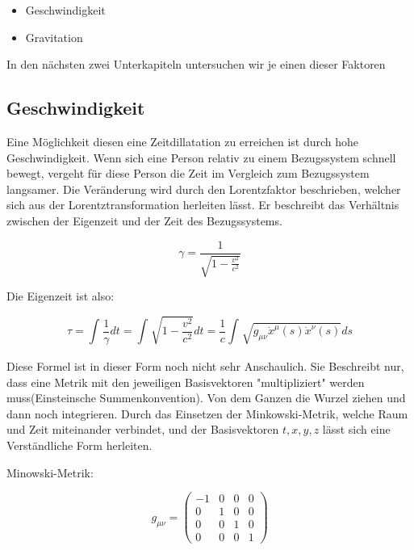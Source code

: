 \begin{refsection}
\begin{itemize}
    \item Geschwindigkeit
    \item Gravitation	
\end{itemize}

In den n\"achsten zwei Unterkapiteln untersuchen wir je einen dieser Faktoren

\subsection{Geschwindigkeit}

Eine M\"oglichkeit diesen eine Zeitdillatation zu erreichen ist durch hohe Geschwindigkeit. Wenn sich eine Person relativ zu einem Bezugssystem schnell bewegt, vergeht f\"ur diese Person die Zeit im Vergleich zum Bezugssystem langsamer. Die Ver\"anderung wird durch den Lorentzfaktor beschrieben, welcher sich aus der Lorentztransformation herleiten l\"asst. Er beschreibt das Verh\"altnis zwischen der Eigenzeit und der Zeit des Bezugssystems.

\begin{equation}
    \gamma=\frac{1}{\sqrt{1-\frac{v^2}{c^2}}} 
\end{equation}



Die Eigenzeit ist also:

\begin{equation}
    \tau
    =
    \int_{}^{}\frac{1}{\gamma}dt=\int_{}^{}\sqrt{1-\frac{v^2}{c^2}}dt
    =
    \frac{1}{c}\int_{}^{}\sqrt{g_{\mu\nu}\dot{x}^{\mu}(s)\dot{x}^{\nu}(s)}ds
\end{equation}

Diese Formel ist in dieser Form noch nicht sehr Anschaulich. Sie Beschreibt nur, dass eine Metrik mit den jeweiligen Basisvektoren "multipliziert" werden muss(Einsteinsche Summenkonvention). Von dem Ganzen die Wurzel ziehen und dann noch integrieren.
Durch das Einsetzen der Minkowski-Metrik, welche Raum und Zeit miteinander verbindet, und der Basisvektoren $t, x, y, z$ l\"asst sich eine Verst\"andliche Form herleiten. 

Minowski-Metrik:

\begin{equation}
    g_{\mu\nu}=
    \begin{pmatrix}
        -1 & 0 & 0 & 0 \\
        0 & 1 & 0 & 0 \\
        0 & 0 & 1 & 0 \\
        0 & 0 & 0 & 1
    \end{pmatrix}
\end{equation}


\end{refsection}
